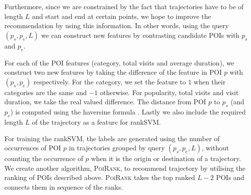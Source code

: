 Furthermore, since we are constrained by the fact that trajectories have to be of length $L$ and start and end at certain points, we hope to improve the recommendation by using this information.
In other words, using the query $(p_s, p_e, L)$ we can construct new features by contrasting
candidate POIs with $p_s$ and $p_e$.

For each of the POI features (category, total visits and average duration),
we construct two new features by taking the difference of
the feature in POI $p$ with $(p_s, p_e)$ respectively.
For the category, we set the feature to $1$ when their categories are the same and $-1$ otherwise.
For popularity, total visits and visit duration, we take the real valued difference.
The distance from POI $p$ to $p_s$ (and $p_e$) is computed using the haversine formula \cite{haversine}.
Lastly we also include the required length $L$ of the trajectory as a feature for rankSVM.

For training the rankSVM, the labels are generated using the number of occurrences of
POI $p$ in trajectories grouped by query $(p_s, p_e, L)$,
without counting the occurrence of $p$ when it is the origin or destination of a trajectory.
We create another algorithm, \textsc{PoiRank}, to recommend trajectory by utilising
the ranking of POIs described above. \textsc{PoiRank} takes the top ranked $L-2$ POIs
and connects them in sequence of the ranks.



